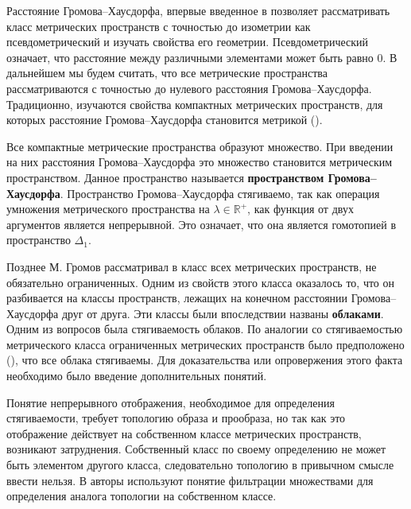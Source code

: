 Расстояние Громова--Хаусдорфа, впервые введенное в \cite{Edwards} позволяет
рассматривать класс метрических пространств с точностью до изометрии как
псевдометрический и изучать свойства его геометрии. Псевдометрический
означает, что расстояние между различными элементами может быть равно \( 0
\). В дальнейшем мы будем считать, что все метрические пространства
рассматриваются с точностью до нулевого расстояния Громова--Хаусдорфа.
Традиционно, изучаются свойства компактных метрических пространств, для
которых расстояние Громова--Хаусдорфа становится метрикой
(\cite{gromov_structures_1981}).

Все компактные метрические пространства образуют множество. При введении на
них расстояния Громова--Хаусдорфа это множество становится метрическим
пространством. Данное пространство называется \textbf{пространством
Громова--Хаусдорфа}. Пространство Громова--Хаусдорфа стягиваемо, так как
операция умножения метрического пространства на \( \lambda \in
\mathbb{R}^+\), как функция от двух аргументов является непрерывной. Это
означает, что она является гомотопией в пространство \( \Delta _1 \).

Позднее М. Громов рассматривал в \cite{gromov_metric_2001} класс всех
метрических пространств, не обязательно ограниченных. Одним из свойств этого
класса оказалось то, что он разбивается на классы пространств, лежащих на
конечном расстоянии Громова--Хаусдорфа друг от друга. Эти классы были
впоследствии названы \textbf{облаками}. Одним из вопросов была стягиваемость
облаков. По аналогии со стягиваемостью метрического класса ограниченных
метрических пространств было предположено (\cite{gromov_structures_1981}),
что все облака стягиваемы. Для доказательства или опровержения этого факта
необходимо было введение дополнительных понятий.

Понятие непрерывного отображения, необходимое для определения стягиваемости,
требует топологию образа и прообраза, но так как это отображение действует на
собственном классе метрических пространств, возникают затруднения.
Собственный класс по своему определению не может быть элементом другого
класса, следовательно топологию в привычном смысле ввести нельзя. В
\cite{borzov_extendability_2020} авторы используют понятие фильтрации
множествами для определения аналога топологии на собственном классе.

